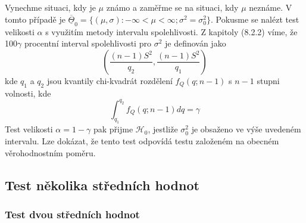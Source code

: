 Vynechme situaci, kdy je $\mu$ známo a zaměřme se na situaci, kdy $\mu$ neznáme. V tomto případě je $\overline{\underline{\Theta}}_0 = \{(\mu, \sigma): - \infty < \mu < \infty; \sigma^2 = \sigma_0^2 \}$. Pokusme se nalézt test velikosti $\alpha$ s využitím metody intervalu spolehlivosti. Z kapitoly (8.2.2) víme, že 100$\gamma$ procentní interval spolehlivosti pro $\sigma^2$ je definován jako
\begin{equation*}
\left(\frac{(n - 1)S^2}{q_2}, \frac{(n - 1)S^2}{q_1}\right)
\end{equation*}
kde $q_1$ a $q_2$ jsou kvantily chi-kvadrát rozdělení $f_Q(q; n - 1)$ s $n - 1$ stupni volnosti, kde
\begin{equation*}
\int_{q_1}^{q_2} f_Q(q; n - 1)dq = \gamma
\end{equation*}
Test velikosti $\alpha = 1 - \gamma$ pak přijme $\mathscr{H}_0$, jestliže $\sigma_0^2$ je obsaženo ve výše uvedeném intervalu. Lze dokázat, že tento test odpovídá testu založeném na obecném věrohodnostním poměru.

\subsection{Test několika středních hodnot}

\subsubsection{Test dvou středních hodnot}


